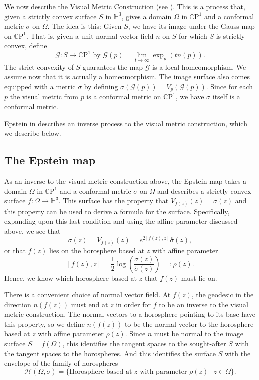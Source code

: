 \documentclass{amsart}
\newcommand{\CP}{\mathbb{C}\mathrm{P}}
\renewcommand{\H}{\mathbb{H}}
\begin{document}
We now describe the Visual Metric Construction (see \cite{anderson1998}). 
This is a process that, given a strictly convex surface $S$ in $\H^3$, gives a domain $\Omega$ in $\CP^1$ and a conformal metric $\sigma$ on $\Omega$.
The idea is this: Given $S$, we have its image under the Gauss map on $\CP^1$. 
That is, given a unit normal vector field $n$ on $S$ for which $S$ is strictly convex, define
\[
\mathcal{G}:S \to \CP^1 \text{ by } \mathcal{G}(p) = \lim_{t \to \infty} \exp_p(t n(p)).
\]
The strict convexity of $S$ guarantees the map $\mathcal{G}$ is a local homeomorphism. 
We assume now that it is actually a homeomorphism.
The image surface also comes equipped with a metric $\sigma$ by defining $\sigma(\mathcal{G}(p)) = V_p(\mathcal{G}(p))$. 
Since for each $p$ the visual metric from $p$ is a conformal metric on $\CP^1$, we have $\sigma$ itself is a conformal metric. 

Epstein in \cite{epstein1984} describes an inverse process to the visual metric construction, which we describe below.



\subsection{The Epstein map}



As an inverse to the visual metric construction above, the Epstein map takes a domain $\Omega$ in $\CP^1$ and a conformal metric $\sigma$ on $\Omega$ and describes a strictly convex surface $f: \Omega \to \H^3$. 
This surface has the property that $V_{f(z)}(z) = \sigma(z)$ and this property can be used to derive a formula for the surface. 
Specifically, expanding upon this last condition and using the affine parameter discussed above, we see that 
\[
\sigma(z) = V_{f(z)}(z) = e^{2 [f(z),z]} \overset{\circ}{\sigma}(z),
\]
or that $f(z)$ lies on the horosphere based at $z$ with affine parameter
\[
[f(z),z] = \frac{1}{2} \log \left( \frac{\sigma(z)}{\overset{\circ}{\sigma}(z)} \right) =: \rho(z).
\]
Hence, we know which horosphere based at $z$ that $f(z)$ must lie on. 

There is a convenient choice of normal vector field. 
At $f(z)$, the geodesic in the direction $n(f(z))$ must end at $z$ in order for $f$ to be an inverse to the visual metric construction. 
The normal vectors to a horosphere pointing to its base have this property, so we define $n(f(z))$ to be the normal vector to the horosphere based at $z$ with affine parameter $\rho(z)$. 
Since $n$ must be normal to the image surface $S = f(\Omega)$, this identifies the tangent spaces to the sought-after $S$ with the tangent spaces to the horospheres. 
And this identifies the surface $S$ with the envelope of the family of horospheres
\[
\mathcal{H}(\Omega,\sigma) = \{ \text{Horosphere based at $z$ with parameter $\rho(z)$} \ | \ z \in \Omega \}.
\]
\end{document}
